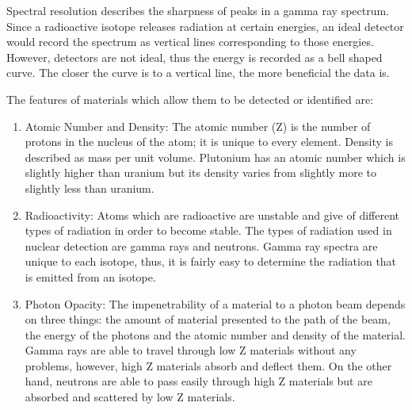 \documentclass[twoside,titlepage,11pt,twocolumn,a4paper]{article}
\begin{document}
Spectral resolution describes the sharpness of peaks in a gamma ray
spectrum. Since a radioactive isotope releases radiation at certain
energies, an ideal detector would record the spectrum as vertical
lines corresponding to those energies. However, detectors are not
ideal, thus the energy is recorded as a bell shaped curve. The closer
the curve is to a vertical line, the more beneficial the data
is. \citep{medalia2007}

The features of materials which allow them to be detected or
identified are:
\begin{enumerate}
\item Atomic Number and Density: The atomic number (Z) is the number
  of protons in the nucleus of the atom; it is unique to every
  element. Density is described as mass per unit volume. Plutonium has
  an atomic number which is slightly higher than uranium but its
  density varies from slightly more to slightly less than uranium.
  \citep{medalia2007}
\item Radioactivity: Atoms which are radioactive are unstable and give
  of different types of radiation in order to become stable. The types
  of radiation used in nuclear detection are gamma rays and
  neutrons. Gamma ray spectra are unique to each
  isotope, thus, it is fairly easy to determine the radiation that is
  emitted from an isotope. \citep{medalia2007} 
\item Photon Opacity: The impenetrability of a material to a photon
  beam depends on three things: the amount of material presented to
  the path of the beam, the energy of the photons and the atomic
  number and density of the material. Gamma rays are able to travel
  through low Z materials without any problems, however, high Z
  materials absorb and deflect them. On the other hand, neutrons are
  able to pass easily through high Z materials but are absorbed and
  scattered by low Z materials. \citep{medalia2007}
\end{enumerate}
\end{document}
